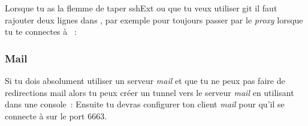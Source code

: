 Lorsque tu as la flemme de taper sshExt ou que tu veux utiliser git il faut rajouter deux lignes dans , par exemple pour toujours passer par le \emph{proxy} lorsque tu te connectes à ~:

\subsubsection{Mail}

Si tu dois absolument utiliser un serveur \emph{mail} et que tu ne peux pas faire de redirections mail alors tu peux créer un tunnel vers le serveur \emph{mail} en utilisant dans une console~:
Ensuite tu devras configurer ton client \emph{mail} pour qu'il se connecte à  sur le port 6663.
